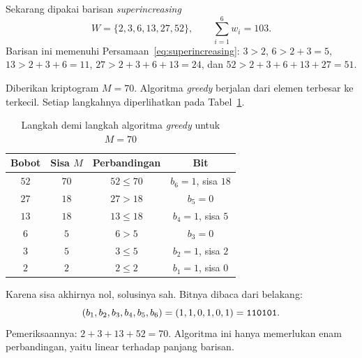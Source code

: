 \begin{example}
\label{ex:greedy-superincreasing}
Sekarang dipakai barisan \textit{superincreasing}
\[ W = \{2, 3, 6, 13, 27, 52\} , \qquad \sum_{i=1}^{6} w_i = 103 . \]
Barisan ini memenuhi Persamaan~\eqref{eq:superincreasing}: $3 > 2$,
$6 > 2 + 3 = 5$, $13 > 2 + 3 + 6 = 11$, $27 > 2 + 3 + 6 + 13 = 24$, dan
$52 > 2 + 3 + 6 + 13 + 27 = 51$.

Diberikan kriptogram $M = 70$. Algoritma \textit{greedy} berjalan dari elemen
terbesar ke terkecil. Setiap langkahnya diperlihatkan pada
Tabel~\ref{tab:greedy-70}.

\begin{table}[htbp]
    \centering
    \begin{tabular}{@{}c c c c@{}}
    \toprule
    \textbf{Bobot} & \textbf{Sisa $M$} & \textbf{Perbandingan} & \textbf{Bit} \\
    \midrule
    $52$ & $70$ & $52 \le 70$ & $b_6 = 1$, sisa $18$ \\
    $27$ & $18$ & $27 > 18$  & $b_5 = 0$ \\
    $13$ & $18$ & $13 \le 18$ & $b_4 = 1$, sisa $5$ \\
    $6$  & $5$  & $6 > 5$    & $b_3 = 0$ \\
    $3$  & $5$  & $3 \le 5$  & $b_2 = 1$, sisa $2$ \\
    $2$  & $2$  & $2 \le 2$  & $b_1 = 1$, sisa $0$ \\
    \bottomrule
    \end{tabular}
    \caption{Langkah demi langkah algoritma \textit{greedy} untuk $M = 70$}
    \label{tab:greedy-70}
\end{table}

Karena sisa akhirnya nol, solusinya sah. Bitnya dibaca dari belakang:
\[ (b_1, b_2, b_3, b_4, b_5, b_6) = (1, 1, 0, 1, 0, 1) = \texttt{110101} . \]
Pemeriksaannya: $2 + 3 + 13 + 52 = 70$. Algoritma ini hanya memerlukan enam
perbandingan, yaitu linear terhadap panjang barisan.

\end{example}

